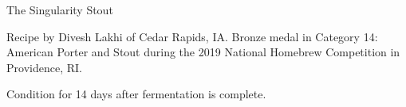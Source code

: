 \begin{recipe}{The Singularity Stout} %

\begin{aboutblock}
Recipe by Divesh Lakhi of Cedar Rapids, IA. Bronze medal in Category 14:
American Porter and Stout during the 2019 National Homebrew Competition
in Providence, RI. \sourceaha
\end{aboutblock}


\begin{methodandtiming}
 
\begin{mashsteps}
\end{mashsteps}

\begin{fermentationsteps}
\end{fermentationsteps}

\begin{directions}
Condition for 14 days after fermentation is complete.
\end{directions}

\end{methodandtiming}

\recipebreak

\begin{ingredientsblock}

\begin{malts}
\end{malts}

\begin{hops}
\end{hops}


\end{ingredientsblock}

\end{recipe}
